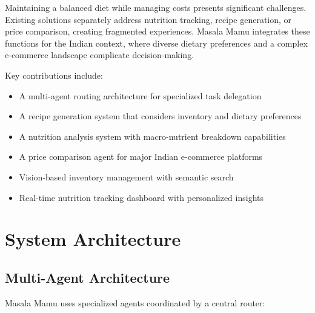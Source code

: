 \documentclass{ecai}
\begin{document}
Maintaining a balanced diet while managing costs presents significant challenges. Existing solutions separately address nutrition tracking, recipe generation, or price comparison, creating fragmented experiences. Masala Mamu integrates these functions for the Indian context, where diverse dietary preferences and a complex e-commerce landscape complicate decision-making.

Key contributions include:
\begin{itemize}[noitemsep,topsep=0pt]
    \item A multi-agent routing architecture for specialized task delegation
    \item A recipe generation system that considers inventory and dietary preferences
    \item A nutrition analysis system with macro-nutrient breakdown capabilities
    \item A price comparison agent for major Indian e-commerce platforms
    \item Vision-based inventory management with semantic search
    \item Real-time nutrition tracking dashboard with personalized insights
\end{itemize}

\section{System Architecture}

\subsection{Multi-Agent Architecture}

Masala Mamu uses specialized agents coordinated by a central router:
\end{document}
